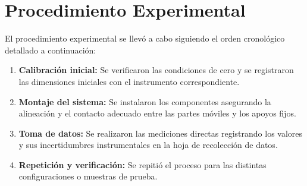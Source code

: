 
\section{Procedimiento Experimental}
\label{sec:procedimiento}

El procedimiento experimental se llevó a cabo siguiendo el orden cronológico detallado a continuación:

\begin{enumerate}
    \item \textbf{Calibración inicial:} Se verificaron las condiciones de cero y se registraron las dimensiones iniciales con el instrumento correspondiente.
    \item \textbf{Montaje del sistema:} Se instalaron los componentes asegurando la alineación y el contacto adecuado entre las partes móviles y los apoyos fijos.
    \item \textbf{Toma de datos:} Se realizaron las mediciones directas registrando los valores y sus incertidumbres instrumentales en la hoja de recolección de datos.
    \item \textbf{Repetición y verificación:} Se repitió el proceso para las distintas configuraciones o muestras de prueba.
\end{enumerate}